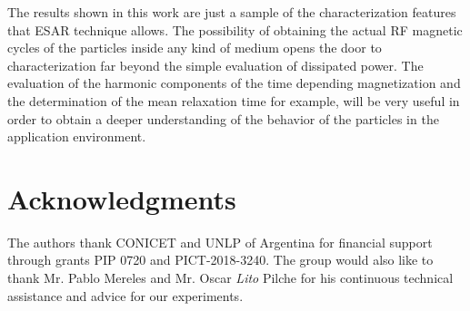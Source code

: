 \documentclass[preprint,12pt]{elsarticle}
\begin{document}
The results shown in this work are just a sample of the characterization features that ESAR technique allows. The possibility of obtaining the actual RF magnetic cycles of the particles inside any kind of medium opens the door to characterization far beyond the simple evaluation of dissipated power. The evaluation of the harmonic components of the time depending magnetization and the determination of the mean relaxation time for example, will be very useful in order to obtain a deeper understanding of the behavior of the particles in the application environment.


\section*{Acknowledgments}
     The authors thank CONICET and UNLP of Argentina for financial support through grants PIP 0720 and PICT-2018-3240. The group would also like to thank Mr. Pablo Mereles and Mr. Oscar \textit{Lito} Pilche for his
continuous technical assistance and advice for our experiments.
\end{document}
